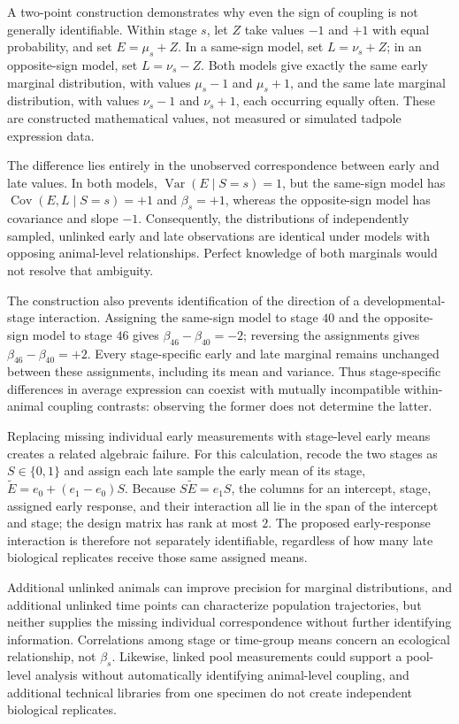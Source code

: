 \documentclass[11pt]{article}
\begin{document}
A two-point construction demonstrates why even the sign of coupling is not generally identifiable. Within stage $s$, let $Z$ take values $-1$ and $+1$ with equal probability, and set $E=\mu_s+Z$. In a same-sign model, set $L=\nu_s+Z$; in an opposite-sign model, set $L=\nu_s-Z$. Both models give exactly the same early marginal distribution, with values $\mu_s-1$ and $\mu_s+1$, and the same late marginal distribution, with values $\nu_s-1$ and $\nu_s+1$, each occurring equally often. These are constructed mathematical values, not measured or simulated tadpole expression data.

The difference lies entirely in the unobserved correspondence between early and late values. In both models, $\operatorname{Var}(E\mid S=s)=1$, but the same-sign model has $\operatorname{Cov}(E,L\mid S=s)=+1$ and $\beta_s=+1$, whereas the opposite-sign model has covariance and slope $-1$. Consequently, the distributions of independently sampled, unlinked early and late observations are identical under models with opposing animal-level relationships. Perfect knowledge of both marginals would not resolve that ambiguity.

The construction also prevents identification of the direction of a developmental-stage interaction. Assigning the same-sign model to stage $40$ and the opposite-sign model to stage $46$ gives $\beta_{46}-\beta_{40}=-2$; reversing the assignments gives $\beta_{46}-\beta_{40}=+2$. Every stage-specific early and late marginal remains unchanged between these assignments, including its mean and variance. Thus stage-specific differences in average expression can coexist with mutually incompatible within-animal coupling contrasts: observing the former does not determine the latter.

Replacing missing individual early measurements with stage-level early means creates a related algebraic failure. For this calculation, recode the two stages as $S\in\{0,1\}$ and assign each late sample the early mean of its stage, $\widetilde E=e_0+(e_1-e_0)S$. Because $S\widetilde E=e_1S$, the columns for an intercept, stage, assigned early response, and their interaction all lie in the span of the intercept and stage; the design matrix has rank at most $2$. The proposed early-response interaction is therefore not separately identifiable, regardless of how many late biological replicates receive those same assigned means.

Additional unlinked animals can improve precision for marginal distributions, and additional unlinked time points can characterize population trajectories, but neither supplies the missing individual correspondence without further identifying information. Correlations among stage or time-group means concern an ecological relationship, not $\beta_s$. Likewise, linked pool measurements could support a pool-level analysis without automatically identifying animal-level coupling, and additional technical libraries from one specimen do not create independent biological replicates.
\end{document}

